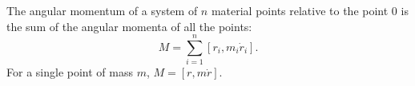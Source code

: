 The angular momentum of a system of $n$ material points relative to the point $0$ is the sum of the angular momenta of all the points:
$$M = \sum_{i=1}^{n} [r_i, m_i \dot{r}_i].$$
For a single point of mass $m$, $M = [r, m\dot{r}]$.
